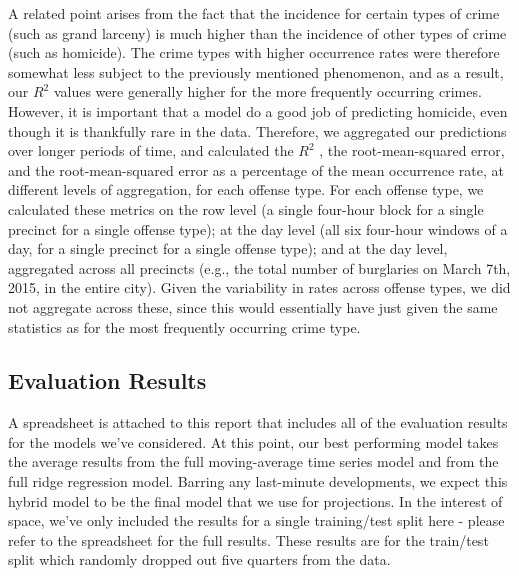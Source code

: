 \documentclass[10pt,journal,compsoc]{IEEEtran}
\begin{document}
A related point arises from the fact that the incidence for certain types of crime (such as grand larceny) is much higher than the incidence of other types of crime (such as
homicide). The crime types with higher occurrence rates were therefore somewhat less
subject to the previously mentioned phenomenon, and as a result, our $R^2$ values were
generally higher for the more frequently occurring crimes. However, it is important that a model do a good job of predicting homicide, even though it is thankfully rare in the data. Therefore, we aggregated our predictions over longer periods of time, and calculated the $R^2$ , the root-mean-squared error, and the root-mean-squared error as a percentage of the mean occurrence rate, at different levels of aggregation, for each offense type. For each offense type, we calculated these metrics on the row level (a single four-hour block for a single precinct for a single offense type); at the day level (all six four-hour windows of a day, for a single precinct for a single offense type); and at the day level, aggregated across all precincts (e.g., the total number of burglaries on March 7th, 2015, in the entire city). Given the variability in rates across offense types, we did not aggregate across these, since this would essentially have just given the same statistics as for the most frequently occurring crime type.

\subsection{Evaluation Results}
A spreadsheet is attached to this report that includes all of the evaluation results for the models we've considered. At this point, our best performing model takes the average
results from the full moving-average time series model and from the full ridge regression
model. Barring any last-minute developments, we expect this hybrid model to be the
final model that we use for projections. In the interest of space, we've only included the results for a single training/test split here - please refer to the spreadsheet for the full results. These results are for the train/test split which randomly dropped out five quarters from the data.\\
\end{document}
